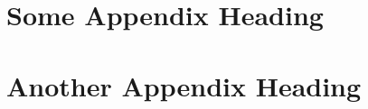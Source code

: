 \chapter{Some Appendix Heading}
\Blindtext[5]
\chapter{Another Appendix Heading}
\Blindtext[5]
\endinput

